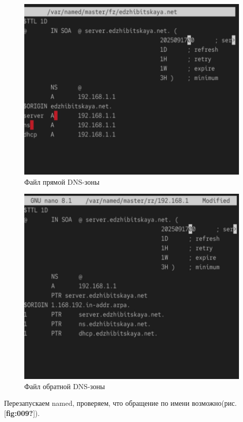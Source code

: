 \documentclass[
  english,
  russian,
  12pt,
  a4paper,
  DIV=11,
  numbers=noendperiod]{scrreprt}
\begin{document}
\begin{figure}

{\centering \includegraphics[width=0.7\linewidth,height=\textheight,keepaspectratio]{image/7.jpg}

}

\caption{Файл прямой DNS-зоны}

\end{figure}%

\begin{figure}

{\centering \includegraphics[width=0.7\linewidth,height=\textheight,keepaspectratio]{image/8.jpg}

}

\caption{Файл обратной DNS-зоны}

\end{figure}%

Перезапускаем named, проверяем, что обращение по имени возможно(рис.
{[}\textbf{fig:009?}{]}).
\end{document}
